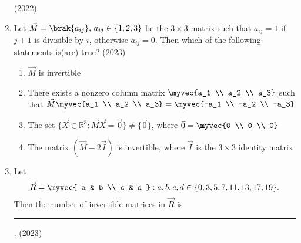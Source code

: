 \begin{enumerate}[label=\thesubsection.\arabic*.,ref=\thesubsection.\theenumi]
\hfill (2022)
\item Let $\vec{M} = \brak{ a_{ij} }, \, a_{ij} \in \{1,2,3\}$ be the $3 \times 3$ matrix such that $a_{ij} = 1$ if $j + 1$ is divisible by $i$, otherwise $a_{ij} = 0$. Then which of the following statements is(are) true?  
\hfill (2023)
\begin{enumerate}  
\item $\vec{M}$ is invertible  
\item There exists a nonzero column matrix $\myvec{a_1 \\ a_2 \\ a_3}$ such that $\vec{M} \myvec{a_1 \\ a_2 \\ a_3} = \myvec{-a_1 \\ -a_2 \\ -a_3}$  
\item The set $\{ \vec{X} \in \mathbb{R}^3 : \vec{M}\vec{X} = \vec{0} \} \neq \{\vec{0}\}$, where $\vec{0}= \myvec{0 \\ 0 \\ 0}$  
\item The matrix $(\vec{M} - 2\vec{I})$ is invertible, where $\vec{I}$ is the $3 \times 3$ identity matrix  
\end{enumerate}
\item Let $$\vec{R} =  \myvec{ a & b \\ c & d } : a, b, c, d \in \{0,3,5,7,11,13,17,19\}. $$
Then the number of invertible matrices in $\vec{R}$ is
\rule{1cm}{0.1pt}.
\hfill (2023)
%
\end{enumerate}

